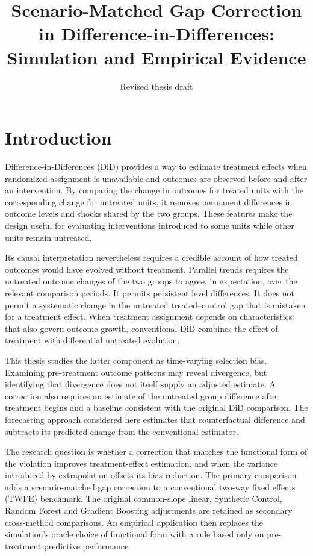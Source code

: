 \documentclass[11pt,a4paper]{article}
\title{Scenario-Matched Gap Correction in Difference-in-Differences:\\Simulation and Empirical Evidence}
\author{}
\date{Revised thesis draft}
\begin{document}
\maketitle


\section{Introduction}\label{sec:introduction}
Difference-in-Differences (DiD) provides a way to estimate treatment effects when randomized assignment is unavailable and outcomes are observed before and after an intervention. By comparing the change in outcomes for treated units with the corresponding change for untreated units, it removes permanent differences in outcome levels and shocks shared by the two groups. These features make the design useful for evaluating interventions introduced to some units while other units remain untreated.

Its causal interpretation nevertheless requires a credible account of how treated outcomes would have evolved without treatment. Parallel trends requires the untreated outcome changes of the two groups to agree, in expectation, over the relevant comparison periods. It permits persistent level differences. It does not permit a systematic change in the untreated treated--control gap that is mistaken for a treatment effect. When treatment assignment depends on characteristics that also govern outcome growth, conventional DiD combines the effect of treatment with differential untreated evolution.

This thesis studies the latter component as time-varying selection bias. Examining pre-treatment outcome patterns may reveal divergence, but identifying that divergence does not itself supply an adjusted estimate. A correction also requires an estimate of the untreated group difference after treatment begins and a baseline consistent with the original DiD comparison. The forecasting approach considered here estimates that counterfactual difference and subtracts its predicted change from the conventional estimator.

The research question is whether a correction that matches the functional form of the violation improves treatment-effect estimation, and when the variance introduced by extrapolation offsets its bias reduction. The primary comparison adds a scenario-matched gap correction to a conventional two-way fixed effects (TWFE) benchmark. The original common-slope linear, Synthetic Control, Random Forest and Gradient Boosting adjustments are retained as secondary cross-method comparisons. An empirical application then replaces the simulation's oracle choice of functional form with a rule based only on pre-treatment predictive performance.
\end{document}
